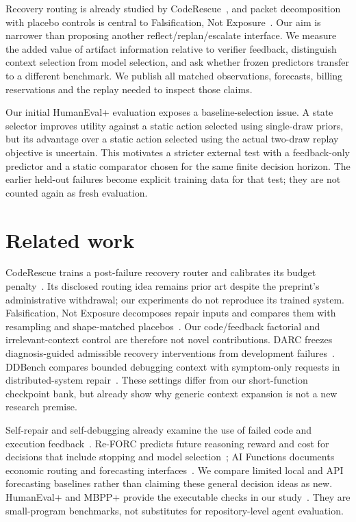 \documentclass[10pt,twocolumn]{article}
\begin{document}
Recovery routing is already studied by CodeRescue~\cite{coderescue}, and
packet decomposition with placebo controls is central to Falsification, Not
Exposure~\cite{falsification}. Our aim is narrower than proposing another
reflect/replan/escalate interface. We measure the added value of artifact
information relative to verifier feedback, distinguish context selection from
model selection, and ask whether frozen predictors transfer to a different
benchmark. We publish all matched observations, forecasts, billing reservations
and the replay needed to inspect those claims.

Our initial HumanEval+ evaluation exposes a baseline-selection issue. A state
selector improves utility against a static action selected using single-draw
priors, but its advantage over a static action selected using the actual
two-draw replay objective is uncertain. This motivates a stricter external
test with a feedback-only predictor and a static comparator chosen for the
same finite decision horizon. The earlier held-out failures become explicit
training data for that test; they are not counted again as fresh evaluation.

\section{Related work}

CodeRescue trains a post-failure recovery router and calibrates its budget
penalty~\cite{coderescue}. Its disclosed routing idea remains prior art despite
the preprint's administrative withdrawal; our experiments do not reproduce its
trained system. Falsification, Not Exposure decomposes repair inputs and
compares them with resampling and shape-matched placebos~\cite{falsification}.
Our code/feedback factorial and irrelevant-context control are therefore not
novel contributions. DARC freezes diagnosis-guided admissible recovery
interventions from development failures~\cite{darc}. DDBench compares bounded
debugging context with symptom-only requests in distributed-system
repair~\cite{ddbench}. These settings differ from our short-function
checkpoint bank, but already show why generic context expansion is not a new
research premise.

Self-repair and self-debugging already examine the use of failed code and
execution feedback~\cite{selfrepair,selfdebug}. Re-FORC predicts future reasoning
reward and cost for decisions that include stopping and model
selection~\cite{reforc}; AI Functions documents economic routing and forecasting
interfaces~\cite{aifunctions}. We compare limited local and API forecasting
baselines rather than claiming these general decision ideas as new.
HumanEval+ and MBPP+ provide the executable checks in our
study~\cite{evalplus,mbpp}. They are small-program benchmarks, not substitutes
for repository-level agent evaluation.
\end{document}

